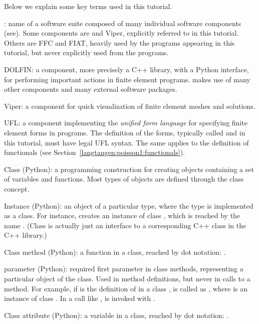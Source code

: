 Below we explain some key terms used in this tutorial.
%
\begin{trivlist}
  \item[\fenics:] name of a software suite composed of many individual
  software components (see\break {}). Some components are
  \dolfin{} and Viper, explicitly referred to in this tutorial. Others are
  FFC and FIAT, heavily used by the programs appearing in this tutorial,
  but never explicitly used from the programs.

  \item[DOLFIN:] a \fenics{} component, more precisely a C++ library,
  with a Python interface, for performing important actions in finite
  element programs. \dolfin{} makes use of many other \fenics{} components
  and many external software packages.

  \item[Viper:] a \fenics{} component for quick visualization of finite
  element meshes and solutions.

  \item[UFL:] a \fenics{} component implementing the \emph{unified
  form language} for specifying finite element forms in \fenics{}
  programs.  The definition of the forms, typically called
   and  in this tutorial, must have legal UFL
  syntax. The same applies to the definition of functionals (see
  Section~\ref{langtangen:poisson1:functionals}).

  \item[Class (Python):] a programming construction for creating objects
  containing a set of variables and functions. Most types of \fenics{}
  objects are defined through the class concept.

  \item[Instance (Python):] an object of a particular type, where the type
  is implemented as a class. For instance, 
  creates an instance of class , which is reached by
  the name . (Class  is actually just an
  interface to a corresponding C++ class in the \dolfin{} C++ library.)

  \item[Class method (Python):] a function in a class, reached by dot
  notation: .

  \item[\emp{self} parameter (Python):] required first parameter in class
  methods, representing a particular object of the class.
  Used in method definitions, but never in calls to a method.  For example,
  if  is the definition of  in a class
  ,  is called as , where 
  is an instance of class .  In a call like ,
   is invoked with .

  \item[Class attribute (Python):] a variable in a class, reached by
  dot notation: .
\end{trivlist}

